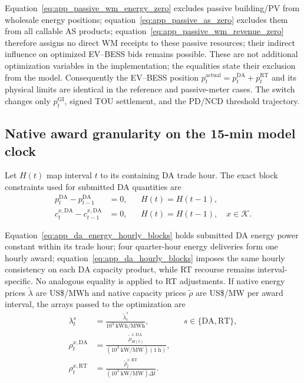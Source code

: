 \documentclass[final,5p,times]{elsarticle}
\newcommand{\dt}{\Delta t}
\newcommand{\DA}{\mathrm{DA}}
\newcommand{\RT}{\mathrm{RT}}
\newcommand{\GI}{\mathrm{GI}}
\newcommand{\actual}{\mathrm{actual}}
\newcommand{\calK}{\mathcal{K}}
\begin{document}
Equation~\eqref{eq:app_passive_wm_energy_zero} excludes passive building/PV from wholesale energy positions; equation~\eqref{eq:app_passive_as_zero} excludes them from all callable AS products; equation~\eqref{eq:app_passive_wm_revenue_zero} therefore assigns no direct WM receipts to these passive resources; their indirect influence on optimized EV--BESS bids remains possible.
These are not additional optimization variables in the implementation; the
equalities state their exclusion from the model. Consequently the EV--BESS
position $p_t^{\actual}=p_t^{\DA}+p_t^{\RT}$ and its physical limits are
identical in the reference and passive-meter cases. The switch changes only
$p_t^{\GI}$, signed TOU settlement, and the PD/NCD threshold trajectory.

\subsection{Native award granularity on the 15-min model clock}
Let $H(t)$ map interval $t$ to its containing DA trade hour. The exact block
constraints used for submitted DA quantities are
\begin{align}
p_t^{\DA}-p_{t-1}^{\DA}&=0,
&&H(t)=H(t-1),\label{eq:app_da_energy_hourly_blocks}\\
c_t^{x,\DA}-c_{t-1}^{x,\DA}&=0,
&&H(t)=H(t-1),\quad x\in\calK.
\label{eq:app_da_hourly_blocks}
\end{align}

Equation~\eqref{eq:app_da_energy_hourly_blocks} holds submitted DA energy power constant within its trade hour; four quarter-hour energy deliveries form one hourly award; equation~\eqref{eq:app_da_hourly_blocks} imposes the same hourly consistency on each DA capacity product, while RT recourse remains interval-specific.
No analogous equality is applied to RT adjustments. If native energy prices
$\widetilde\lambda$ are US\$/MWh and native capacity prices
$\widetilde\rho$ are US\$/MW per award interval, the arrays passed to the
optimization are
\begin{align}
\lambda_t^{s}&=\frac{\widetilde\lambda_t^{s}}{10^3\ \mathrm{kWh/MWh}},
&&s\in\{\DA,\RT\},\label{eq:app_lmp_units}\\
\rho_t^{x,\DA}&=\frac{\widetilde\rho_{H(t)}^{x,\DA}}{(10^3\ \mathrm{kW/MW})(1\ \mathrm{h})},
&&\label{eq:app_da_as_units}\\
\rho_t^{x,\RT}&=\frac{\widetilde\rho_t^{x,\RT}}{(10^3\ \mathrm{kW/MW})\dt}.
&&\label{eq:app_rt_as_units}
\end{align}
\end{document}
